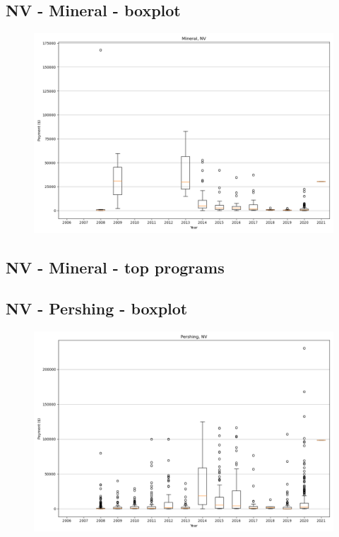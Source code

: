 \subsection*{NV - Mineral - boxplot}
\begin{figure}[h]
\centering
\includegraphics[width=7in]{../output/boxplots/counties/Mineral-NV_boxplot.png}
\end{figure}


\subsection*{NV - Mineral - top programs}

\newpage
\subsection*{NV - Pershing - boxplot}
\begin{figure}[h]
\centering
\includegraphics[width=7in]{../output/boxplots/counties/Pershing-NV_boxplot.png}
\end{figure}


